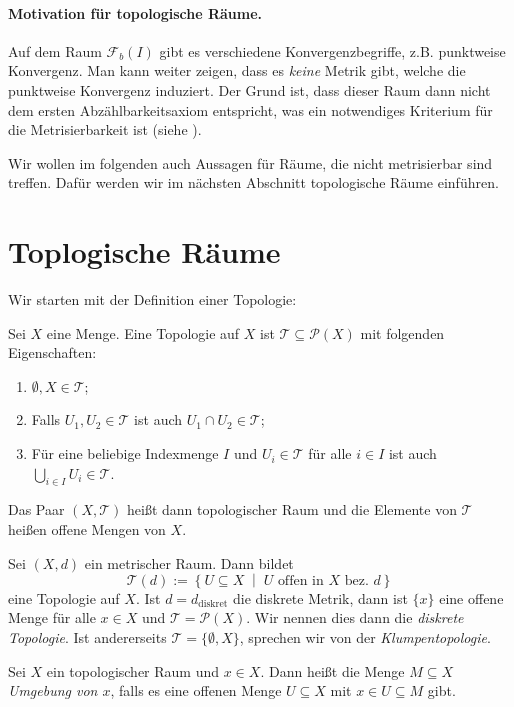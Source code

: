 \documentclass[
12pt, 
openany, 
a4paper, 
final,
fleqn, 
]{myclass}
\numberwithin{equation}{chapter}
\numberwithin{section}{chapter}
\newcommand{\varF}{\mathcal F}
\newcommand{\varT}{\mathcal T}
\newcommand{\powerset}[1]{\mathcal P\left(#1\right)}
\newcommand{\union}{\bigcup}
\newcommand{\set}[2]{\left\{#1\;\middle|\;#2\right\}}
\begin{document}
\paragraph{Motivation für topologische Räume.} Auf dem Raum $ \varF_{b}(I) $ gibt es verschiedene Konvergenzbegriffe, z.B. punktweise Konvergenz. Man kann weiter zeigen, dass es \emph{keine} Metrik gibt, welche die punktweise Konvergenz induziert. Der Grund ist, dass dieser Raum dann nicht dem ersten Abzählbarkeitsaxiom entspricht, was ein notwendiges Kriterium für die Metrisierbarkeit ist (siehe ).

Wir wollen im folgenden auch Aussagen für Räume, die nicht metrisierbar sind treffen. Dafür werden wir im nächsten Abschnitt topologische Räume einführen.

\section{Toplogische Räume}
Wir starten mit der Definition einer Topologie: 
\begin{defn}\label{1.15}
Sei $X$ eine Menge. Eine Topologie auf $X$ ist $\varT \subseteq \powerset X$ mit folgenden Eigenschaften: 
\begin{enumerate}[label=($\varT$\arabic*)]
\item $\emptyset, X \in \varT$; 
\item Falls $U_1, U_2 \in \varT$ ist auch $U_1 \cap U_2 \in \varT$; 
\item Für eine beliebige Indexmenge $I$ und $U_i\in \varT$ für alle $i\in I$ ist auch $\union_{i\in I}U_i\in \varT$.
\end{enumerate}
Das Paar $(X, \varT)$ heißt dann topologischer Raum und die Elemente von $\varT$ heißen offene Mengen von $X$. 
\end{defn}
\begin{eg}\label{1.16}
Sei $ (X, d) $ ein metrischer Raum. Dann bildet 
\[ 
\varT(d) := \set{U\subseteq X}{ U \text{ offen in $X$ bez. $d$}}
\]
eine Topologie auf $X$. Ist $d=d_{\operatorname{diskret}}$ die diskrete Metrik, dann ist $ \{x\} $ eine offene Menge für alle $x\in X$ und $ \varT= \powerset{X} $. Wir nennen dies dann die \emph{diskrete Topologie}. Ist andererseits $ \varT = \{\emptyset, X\} $, sprechen wir von der \emph{Klumpentopologie}. 
\end{eg}
\begin{defn}\label{1.17}
Sei $X$ ein topologischer Raum und $x\in X$. Dann heißt die Menge $M\subseteq X$ \emph{Umgebung von $x$}, falls es eine offenen Menge $U\subseteq X$ mit $x\in U\subseteq M$ gibt. 
\end{defn}
\end{document}
